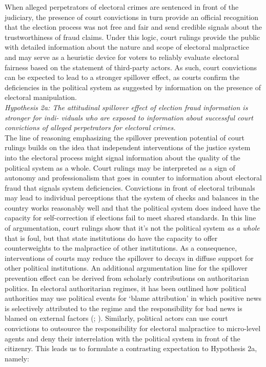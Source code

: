 \documentclass[11pt, ngerman,english,a4]{article}
\begin{document}
When alleged perpetrators of electoral crimes are sentenced in front of the judiciary, the presence of court convictions in turn provide an official recognition that the election process was not free and fair and send credible signals about the trustworthiness of fraud claims. Under this logic, court rulings provide the public with detailed information about the nature and scope of electoral malpractice and may serve as a heuristic device for voters to reliably evaluate electoral fairness based on the statement of third-party actors. As such, court convictions can be expected to lead to a stronger spillover effect, as courts confirm the deficiencies in the political system as suggested by information on the presence of electoral manipulation. \\

\indent \textit{Hypothesis 2a: The attitudinal spillover effect of election fraud information is stronger for indi- \indent viduals who are exposed to information about successful court convictions of alleged perpetrators \indent for electoral crimes.} \\

The line of reasoning emphasizing the spillover prevention potential of court rulings builds on the idea that independent interventions of the justice system into the electoral process might signal information about the quality of the political system as a whole. Court rulings may be interpreted as a sign of autonomy and professionalism that goes in counter to information about electoral fraud that signals system deficiencies. Convictions in front of electoral tribunals may lead to individual perceptions that the system of checks and balances in the country works reasonably well and that the political system does indeed have the capacity for self-correction if elections fail to meet shared standards.  In this line of argumentation, court rulings show that it’s not the political system \textit{as a whole} that is foul, but that state institutions do have the capacity to offer counterweights to the malpractice of other institutions. As a consequence, interventions of courts may reduce the spillover to decays in diffuse support for other political institutions. An additional argumentation line for the spillover prevention effect can be derived from scholarly contributions on  authoritarian politics. In electoral authoritarian regimes, it has been outlined how political authorities may use political events for `blame attribution’ in which positive news is selectively attributed to the regime and the responsibility for bad news is blamed on external factors (\citealt{Beazer2019}; \citealt{Rozenas2019b}). Similarly, political actors can use court convictions to outsource the responsibility for electoral malpractice to micro-level agents and deny their interrelation with the political system in front of the citizenry. This leads us to formulate a contrasting expectation to Hypothesis 2a, namely: \\
\end{document}
